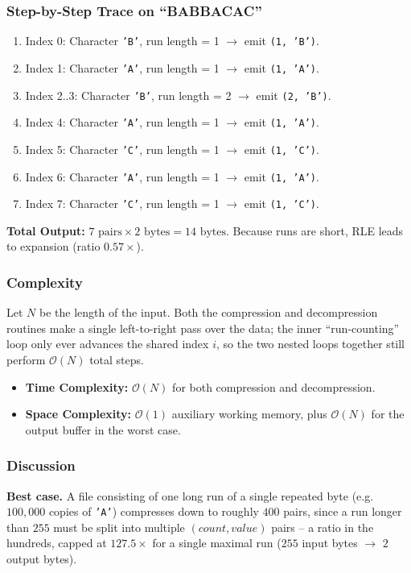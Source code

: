\documentclass{article}
\begin{document}
\subsubsection{Step-by-Step Trace on ``BABBACAC''}
\begin{enumerate}
    \item Index 0: Character \texttt{'B'}, run length = 1 $\to$ emit \texttt{(1, 'B')}.
    \item Index 1: Character \texttt{'A'}, run length = 1 $\to$ emit \texttt{(1, 'A')}.
    \item Index 2..3: Character \texttt{'B'}, run length = 2 $\to$ emit \texttt{(2, 'B')}.
    \item Index 4: Character \texttt{'A'}, run length = 1 $\to$ emit \texttt{(1, 'A')}.
    \item Index 5: Character \texttt{'C'}, run length = 1 $\to$ emit \texttt{(1, 'C')}.
    \item Index 6: Character \texttt{'A'}, run length = 1 $\to$ emit \texttt{(1, 'A')}.
    \item Index 7: Character \texttt{'C'}, run length = 1 $\to$ emit \texttt{(1, 'C')}.
\end{enumerate}
\textbf{Total Output:} $7 \text{ pairs} \times 2\text{ bytes} = 14\text{ bytes}$. Because runs are short, RLE leads to expansion (ratio $0.57\times$).

\subsubsection{Complexity}
Let $N$ be the length of the input. Both the compression and decompression routines make a single left-to-right pass over the data; the inner ``run-counting'' loop only ever advances the shared index $i$, so the two nested loops together still perform $\mathcal{O}(N)$ total steps.
\begin{itemize}
    \item \textbf{Time Complexity:} $\mathcal{O}(N)$ for both compression and decompression.
    \item \textbf{Space Complexity:} $\mathcal{O}(1)$ auxiliary working memory, plus $\mathcal{O}(N)$ for the output buffer in the worst case.
\end{itemize}

\subsubsection{Discussion}
\textbf{Best case.} A file consisting of one long run of a single repeated byte (e.g. $100{,}000$ copies of \texttt{'A'}) compresses down to roughly $400$ pairs, since a run longer than $255$ must be split into multiple $(count,value)$ pairs -- a ratio in the hundreds, capped at $127.5\times$ for a single maximal run ($255$ input bytes $\to$ $2$ output bytes).
\end{document}

